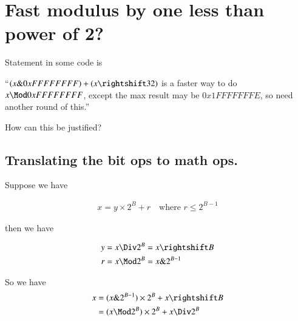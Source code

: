 
%
%





%

\section{Fast modulus by one less than power of 2? }

Statement in some code is

``$(x \& 0xFFFFFFFF) + (x \rightshift 32)$ is a faster way to do $x \Mod 0xFFFFFFFF$, except the max result may be
$0x1FFFFFFFE$, so need another round of this.''

How can this be justified?

\subsection{Translating the bit ops to math ops. }

Suppose we have 

\begin{align}\label{eqn:fletcher:modPower2}
x = y \times 2^B + r \quad \mbox{where $r \le 2^{B-1}$}
\end{align}

then we have

\begin{align*}
y &= x \Div 2^{B} = x \rightshift B \\
r &= x \Mod 2^B = x \& 2^{B-1}
\end{align*}

So we have
\begin{align*}
x 
&= (x \& 2^{B-1}) \times 2^B + x \rightshift B \\
&= (x \Mod 2^B) \times 2^B + x \Div 2^B \\
\end{align*}


